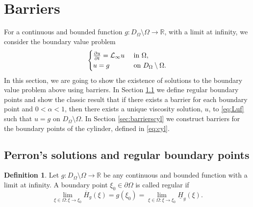 \documentclass[11pt]{article}
\newcommand{\R}{\mathbb{R}}
\providecommand{\Rnp}{D_{\Omega}}
\providecommand{\RnpO}{D_{\Omega}\setminus \Omega}
\providecommand{\ups}{\overline{H}_g}
\providecommand{\lps}{\underline{H}_g}
\numberwithin{equation}{section}
\theoremstyle{definition}
\newtheorem{definition}[thm]{Definition}
\begin{document}
\section{Barriers}\label{sec:barriers}
For a continuous and bounded function $g: \Rnp \setminus \Omega \to \R$, with a limit at infinity, we consider the boundary value problem 
\begin{align*} 
\begin{cases}
 \frac{\partial u}{\partial t} = \mathcal{L}_{\infty}u &  \textup{ in }  \Omega, \\
 u = g &  \textup{ on }  \RnpO.
\end{cases}
\end{align*}
In this section, we are going to show the existence of solutions to the boundary value problem above using barriers. In Section \ref{sec:Perronbarrier} we define regular boundary points and show the classic result that if there exists a barrier for each boundary point and $0<\alpha<1$, then there exists a unique viscosity solution, $u$, to \eqref{eq:Luf} such that $u=g$ on $\RnpO$. In Section \ref{sec:barrierscyl} we construct barriers for the boundary points of the cylinder, defined in \eqref{eq:cyl}. 

\subsection{Perron's solutions and regular boundary points}\label{sec:Perronbarrier}

\begin{definition}\label{def:regular}
 Let $g: \Rnp \setminus \Omega \to \R$ be any continuous and bounded function with a limit at infinity. A boundary point $\xi_0 \in \partial \Omega$ is called regular if 
\begin{equation}\label{eq:regular}
    \lim_{\xi \in \Omega: \xi \to \xi_0} \ups(\xi)=g(\xi_0)= \lim_{\xi \in \Omega: \xi \to \xi_0} \lps(\xi).
\end{equation} 
\end{definition}
\end{document}
